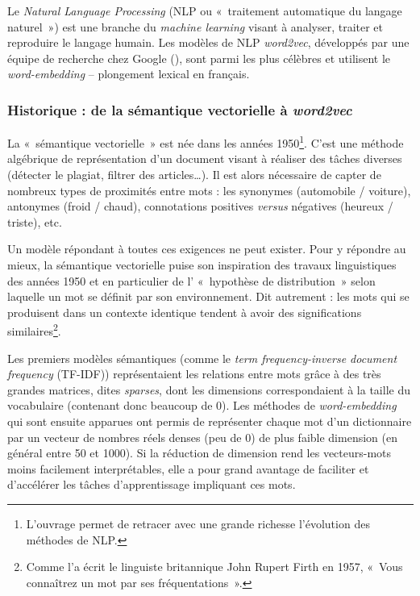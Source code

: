\documentclass[11pt,french,french]{article}
\let\rmarkdownfootnote\footnote%
\def\footnote{\protect\rmarkdownfootnote}
\begin{document}
Le \emph{Natural Language Processing} (NLP ou «~traitement automatique du langage naturel~») est une branche du \emph{machine learning} visant à analyser, traiter et reproduire le langage humain.
Les modèles de NLP \emph{word2vec}, développés par une équipe de recherche chez Google (\cite{Mikolov}), sont parmi les plus célèbres et utilisent le \emph{word-embedding} -- plongement lexical en français.

\hypertarget{historique-de-la-suxe9mantique-vectorielle-uxe0-word2vec}{%
\subsubsection{\texorpdfstring{Historique : de la sémantique vectorielle à \emph{word2vec}}{Historique : de la sémantique vectorielle à word2vec}}\label{historique-de-la-suxe9mantique-vectorielle-uxe0-word2vec}}

La «~sémantique vectorielle~» est née dans les années 1950\footnote{L'ouvrage \cite{Jurafsky} permet de retracer avec une grande richesse l'évolution des méthodes de NLP.}.
C'est une méthode algébrique de représentation d'un document visant à réaliser des tâches diverses (détecter le plagiat, filtrer des articles\dots).
Il est alors nécessaire de capter de nombreux types de proximités entre mots : les synonymes (automobile / voiture), antonymes (froid / chaud), connotations positives \emph{versus} négatives (heureux / triste), etc.

Un modèle répondant à toutes ces exigences ne peut exister.
Pour y répondre au mieux, la sémantique vectorielle puise son inspiration des travaux linguistiques des années 1950 et en particulier de l' «~hypothèse de distribution~» selon laquelle un mot se définit par son environnement.
Dit autrement : les mots qui se produisent dans un contexte identique tendent à avoir des significations similaires\footnote{Comme l'a écrit le linguiste britannique John Rupert Firth en 1957, «~Vous connaîtrez un mot par ses fréquentations~».}.

Les premiers modèles sémantiques (comme le \emph{term frequency-inverse document frequency} (TF-IDF)) représentaient les relations entre mots grâce à des très grandes matrices, dites \emph{sparses}, dont les dimensions correspondaient à la taille du vocabulaire (contenant donc beaucoup de 0). Les méthodes de \emph{word-embedding} qui sont ensuite apparues ont permis de représenter chaque mot d'un dictionnaire par un vecteur de nombres réels denses (peu de 0) de plus faible dimension (en général entre 50 et 1000).
Si la réduction de dimension rend les vecteurs-mots moins facilement interprétables, elle a pour grand avantage de faciliter et d'accélérer les tâches d'apprentissage impliquant ces mots.
\end{document}
